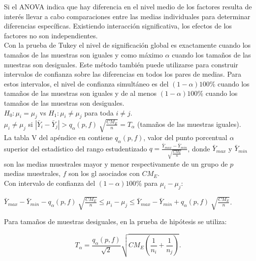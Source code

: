Si el ANOVA indica que hay diferencia en el nivel medio de los factores resulta de interés llevar a cabo comparaciones entre las medias individuales para determinar diferencias específicas. Existiendo interacción significativa, los efectos de los factores no son independientes.\\


Con la prueba de Tukey el nivel de significación global es exactamente  cuando los tamaños de las muestras son iguales y como máximo $\alpha$ cuando los tamaños de las muestras son desiguales. Este método también puede utilizarse para construir intervalos de confianza sobre las diferencias en todos los pares de medias. Para estos intervalos, el nivel de confianza simultáneo es del $(1-\alpha)100\%$ cuando los tamaños de las muestras son iguales y de al menos $(1-\alpha)100\%$  cuando los tamaños de las muestras son desiguales.\\

$H_{0}:\mu_{i} = \mu_{j}$ vs $H_{1}:\mu_{i} \neq \mu_{j}$ para toda $i \neq j$.\\

 $\mu_{i} \neq \mu_{j}$ si $| \bar{Y}_{i} -\bar{Y}_{j} | > q_{\alpha} (p,f) \: \sqrt{\frac{CM_{E}}{n}} = T_{\alpha}$ (tamaños de las muestras iguales).\\
 

La tabla V del apéndice en \textcite{montgomery-2017} contiene $q_{\alpha} (p,f)$, valor del punto porcentual $\alpha$ superior del estadístico del rango estudentizado {\large $q=\frac{ \bar{Y}_{max} -\bar{Y}_{min}}{ \sqrt{\frac{CM_{E}}{n}}}$}, donde $\bar{Y}_{max}$ y $\bar{Y}_{min}$ son las medias muestrales mayor y menor respectivamente de un grupo de $p$ medias muestrales, $f$ son los gl asociados con $CM_{E}$.\\
 
Con intervalo de confianza del  $(1-\alpha)100\%$ para $\mu_{i} - \mu_{j}$:\\
 
\begin{center}
	$ \bar{Y}_{max} -\bar{Y}_{min} -  q_{\alpha} (p,f) \: \sqrt{\frac{CM_{E}}{n}} \leq \mu_{i} - \mu_{j} \leq \bar{Y}_{max} -\bar{Y}_{min} + q_{\alpha} (p,f) \: \sqrt{\frac{CM_{E}}{n}} $. \\
\end{center}

Para tamaños de muestras desiguales, en la prueba de hipótesis se utiliza:\\

\begin{center}
	$$ T_{\alpha} = \frac{q_{\alpha} (p,f)}{\sqrt{2}} \sqrt{CM_{E} (\frac{1}{n_{i}} + \frac{1}{n_{j}})}  .$$ \\
\end{center}


